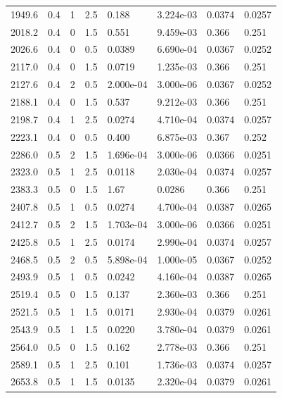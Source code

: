 \documentclass[preview]{standalone}
\begin{document}
{{{\begin{tabular}{L{1.2cm}C{1.2cm} C{0.3cm}C{0.5cm} C{1.4cm}C{1.4cm} C{1.4cm}C{1.4cm}}
  1949.6  &   0.4  & 1     & 2.5 &  0.188  & 3.224e-03  & 0.0374 &  0.0257   \\ 
  2018.2  &   0.4  & 0     & 1.5 &  0.551  & 9.459e-03  & 0.366 &  0.251   \\ 
  2026.6  &   0.4  & 0     & 0.5 &  0.0389  & 6.690e-04  & 0.0367 &  0.0252   \\ 
  2117.0  &   0.4  & 0     & 1.5 &  0.0719  & 1.235e-03  & 0.366 &  0.251   \\ 
  2127.6  &   0.4  & 2     & 0.5 &  2.000e-04  & 3.000e-06  & 0.0367 &  0.0252   \\ 
  2188.1  &   0.4  & 0     & 1.5 &  0.537  & 9.212e-03  & 0.366 &  0.251   \\ 
  2198.7  &   0.4  & 1     & 2.5 &  0.0274  & 4.710e-04  & 0.0374 &  0.0257   \\ 
  2223.1  &   0.4  & 0     & 0.5 &  0.400  & 6.875e-03  & 0.367 &  0.252   \\ 
  2286.0  &   0.5  & 2     & 1.5 &  1.696e-04  & 3.000e-06  & 0.0366 &  0.0251   \\ 
  2323.0  &   0.5  & 1     & 2.5 &  0.0118  & 2.030e-04  & 0.0374 &  0.0257   \\ 
  2383.3  &   0.5  & 0     & 1.5 &  1.67  & 0.0286  & 0.366 &  0.251   \\ 
  2407.8  &   0.5  & 1     & 0.5 &  0.0274  & 4.700e-04  & 0.0387 &  0.0265   \\ 
  2412.7  &   0.5  & 2     & 1.5 &  1.703e-04  & 3.000e-06  & 0.0366 &  0.0251   \\ 
  2425.8  &   0.5  & 1     & 2.5 &  0.0174  & 2.990e-04  & 0.0374 &  0.0257   \\ 
  2468.5  &   0.5  & 2     & 0.5 &  5.898e-04  & 1.000e-05  & 0.0367 &  0.0252   \\ 
  2493.9  &   0.5  & 1     & 0.5 &  0.0242  & 4.160e-04  & 0.0387 &  0.0265   \\ 
  2519.4  &   0.5  & 0     & 1.5 &  0.137  & 2.360e-03  & 0.366 &  0.251   \\ 
  2521.5  &   0.5  & 1     & 1.5 &  0.0171  & 2.930e-04  & 0.0379 &  0.0261   \\ 
  2543.9  &   0.5  & 1     & 1.5 &  0.0220  & 3.780e-04  & 0.0379 &  0.0261   \\ 
  2564.0  &   0.5  & 0     & 1.5 &  0.162  & 2.778e-03  & 0.366 &  0.251   \\ 
  2589.1  &   0.5  & 1     & 2.5 &  0.101  & 1.736e-03  & 0.0374 &  0.0257   \\ 
  2653.8  &   0.5  & 1     & 1.5 &  0.0135  & 2.320e-04  & 0.0379 &  0.0261   \\ 

\end{tabular}}}}
\end{document}
